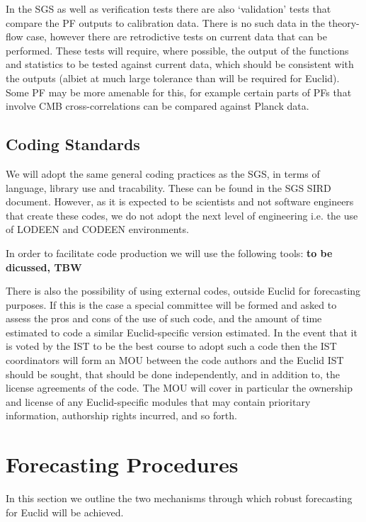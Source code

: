 In the SGS as well as verification tests there are also `validation' tests that compare the PF outputs to calibration 
data. There is no such data in the theory-flow case, however there are retrodictive tests on current data that can be 
performed. These tests will require, where possible, the output of the functions and statistics to be tested against 
current data, which should be consistent with the outputs (albiet at much large tolerance than will be 
required for Euclid). Some PF may be more amenable for this, for example certain parts of PFs that involve 
CMB cross-correlations can be compared against Planck data. 

\subsection{Coding Standards}
We will adopt the same general coding practices as the SGS, in terms of language, library use and tracability. These
can be found in the SGS SIRD document. However, as it is expected to be scientists and not software engineers that 
create these codes, we do not adopt the next level of engineering i.e. the use of LODEEN and CODEEN environments. 

In order to facilitate code production we will use the following tools: {\bf to be dicussed, TBW} 

There is also the possibility of using external codes, outside Euclid for forecasting purposes. If this is the 
case a special committee will be formed and asked to assess the pros and cons of the use of such code, and the 
amount of time estimated to code a similar Euclid-specific version estimated. In the event that it is voted by the IST 
to be the best course to adopt such a code then the IST coordinators will form an  
MOU between the code authors and the Euclid IST should be sought, that should be done independently, and in 
addition to, the license agreements of the code. The MOU will cover in particular the ownership and license of any 
Euclid-specific modules that may contain prioritary information, authorship rights incurred, and so forth.



\section{Forecasting Procedures} 
In this section we outline the two mechanisms through which robust forecasting for Euclid will be achieved. 

